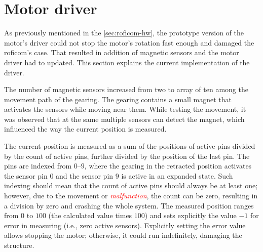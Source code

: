 \documentclass[
  digital,     %
  oneside,     %
  nosansbold,  %
  nocolorbold, %
  nolof,         %
  nolot,         %
]{fithesis4}
\newcommand{\TODO}[1]{\textcolor{red}{\textit{#1}}}
\begin{document}
{{{\section{ Motor driver }

As previously mentioned in the \autoref{sec:roficom-hw}, the prototype version of the motor's driver could not stop the motor's rotation fast enough and damaged the \acrshort{roficom}'s case. That resulted in addition of magnetic sensors and the motor driver had to updated. This section explains the current implementation of the driver.

The number of magnetic sensors increased from two to array of ten among the movement path of the gearing. The gearing contains a small magnet that activates the sensors while moving near them. While testing the movement, it was observed that at the same multiple sensors can detect the magnet, which influenced the way the current position is measured.

The current position is measured as a sum of the positions of active pins divided by the count of active pins, further divided by the position of the last pin. The pins are indexed from $\numrange{0}{9}$, where the gearing in the retracted position activates the sensor pin $0$ and the sensor pin $9$ is active in an expanded state. Such indexing should mean that the count of active pins should always be at least one; however, due to the movement or \TODO{malfunction}, the count can be zero, resulting in a division by zero and crashing the whole system. The measured position ranges from $0$ to $100$ (the calculated value times $100$) and sets explicitly the value $-1$ for error in measuring (i.e., zero active sensors). Explicitly setting the error value allows stopping the motor; otherwise, it could run indefinitely, damaging the structure. 

}}}
\end{document}
